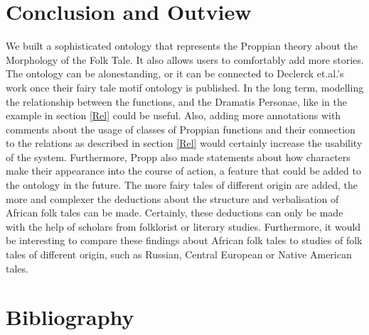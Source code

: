 \documentclass[10pt,a4paper]{article}
\begin{document}
\section{Conclusion and Outview}
We built a sophisticated ontology that represents the Proppian theory about the Morphology of the Folk Tale.\cite{propp1968} It also allows users to comfortably add more stories. The ontology can be alonestanding, or it can be connected to Declerck et.al.'s \cite{Declerck2017} work once their fairy tale motif ontology is published. In the long term, modelling the relationship between the functions, and the Dramatis Personae, like in the example in section \ref{Rel} could be useful. Also, adding more annotations with comments about the usage of classes of Proppian functions and their connection to the relations as described in section \ref{Rel} would certainly increase the usability of the system. Furthermore, Propp also made statements about how characters make their appearance into the course of action, a feature that could be added to the ontology in the future. 
 The more fairy tales of different origin are added, the more and complexer the deductions about the structure and verbalisation of African folk tales can be made. Certainly, these deductions can only be made with the help of scholars from folklorist or literary studies. Furthermore, it would be interesting to compare these findings about African folk tales to studies of folk tales of different origin, such as Russian, Central European or Native American tales. 
\newpage
    
\section{Bibliography}

 

\end{document}
